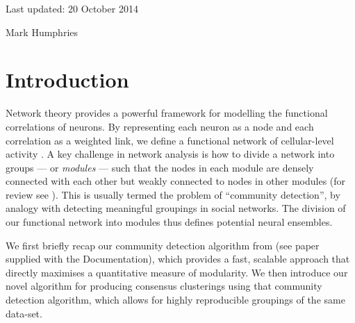 \documentclass[11pt,a4paper]{article}
\begin{document}

\vspace{5mm}

\noindent Last updated: 20 October 2014

\vspace{5mm}

\noindent Mark Humphries
\vspace{5mm}


\tableofcontents

\vspace{0.5cm}

\section{Introduction}
Network theory provides a powerful framework for modelling the functional correlations of neurons. By representing each neuron as a node and each correlation as a weighted link, we define a functional network of cellular-level activity \citep{Humphries2011}. A key challenge in network analysis is how to divide a network into groups --- or {\em modules} --- such that the nodes in each module are densely connected with each other but weakly connected to nodes in other modules (for review see \citep{Fortunato2010,Newman2012}). This is usually termed the problem of ``community detection'', by analogy with detecting meaningful groupings in social networks. The division of our functional network into modules thus defines potential neural ensembles.

We first briefly recap our community detection algorithm from \citep{Humphries2011} (see paper supplied with the Documentation), which provides a fast, scalable approach that directly maximises a quantitative measure of modularity. We then introduce our novel algorithm for producing consensus clusterings using that community detection algorithm, which allows for highly reproducible groupings of the same data-set.
\end{document}
